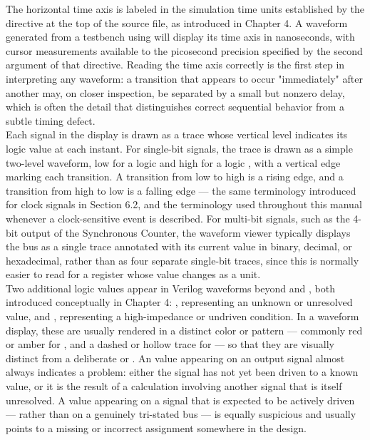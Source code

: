 The horizontal time axis is labeled in the simulation time units established by the  directive at the top of the source file, as introduced in Chapter 4. A waveform generated from a testbench using  will display its time axis in nanoseconds, with cursor measurements available to the picosecond precision specified by the second argument of that directive. Reading the time axis correctly is the first step in interpreting any waveform: a transition that appears to occur "immediately" after another may, on closer inspection, be separated by a small but nonzero delay, which is often the detail that distinguishes correct sequential behavior from a subtle timing defect.\\

Each signal in the display is drawn as a trace whose vertical level indicates its logic value at each instant. For single-bit signals, the trace is drawn as a simple two-level waveform, low for a logic  and high for a logic , with a vertical edge marking each transition. A transition from low to high is a rising edge, and a transition from high to low is a falling edge --- the same terminology introduced for clock signals in Section 6.2, and the terminology used throughout this manual whenever a clock-sensitive event is described. For multi-bit signals, such as the 4-bit  output of the Synchronous Counter, the waveform viewer typically displays the bus as a single trace annotated with its current value in binary, decimal, or hexadecimal, rather than as four separate single-bit traces, since this is normally easier to read for a register whose value changes as a unit.\\

Two additional logic values appear in Verilog waveforms beyond  and , both introduced conceptually in Chapter 4: , representing an unknown or unresolved value, and , representing a high-impedance or undriven condition. In a waveform display, these are usually rendered in a distinct color or pattern --- commonly red or amber for , and a dashed or hollow trace for  --- so that they are visually distinct from a deliberate  or . An  value appearing on an output signal almost always indicates a problem: either the signal has not yet been driven to a known value, or it is the result of a calculation involving another signal that is itself unresolved. A  value appearing on a signal that is expected to be actively driven --- rather than on a genuinely tri-stated bus --- is equally suspicious and usually points to a missing or incorrect assignment somewhere in the design.\\


